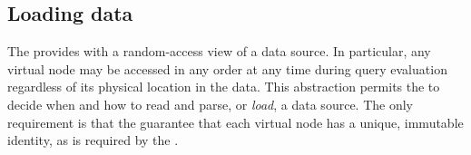 \subsection{Loading \pads{} data}

The \padx{} \absdm{} provides \Galax{} with a random-access view of a
\pads{} data source. In particular, any virtual node may be accessed
in any order at any time during query evaluation regardless of its
physical location in the \pads{} data.  This abstraction permits the
\padx{} \condm{} to decide when and how to read and parse, or \emph{load},
a data source.  The only requirement is that the \padx{} \condm{}
guarantee that each virtual node has a unique, immutable identity,
as is required by the \Galax{} \absdm{}.

